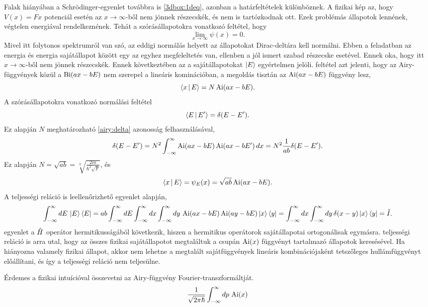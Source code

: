 \label{nowall}
Falak hiányában a Schrödinger-egyenlet továbbra is \eqref{3dbox:1deq}, azonban a határfeltételek különböznek. A fizikai kép az, hogy $V(x)=Fx$ potenciál esetén az $x\to\infty$-ből nem jönnek részecskék, és nem is tartózkodnak ott. Ezek problémás állapotok lennének, végtelen energiával rendelkeznének. Tehát a szórásállapotokra vonatkozó feltétel, hogy
\begin{equation}
	\lim_{x\to\infty}\psi(x) = 0.
	\label{nowall:boundary}
\end{equation}
Mivel itt folytonos spektrumról van szó, az eddigi normálás helyett az állapotokat Dirac-deltára kell normálni. Ebben a feladatban az energia és energia sajátállapot között egy az egyhez megfeleltetés van, ellenben a jól ismert szabad részecske esetével. Ennek oka, hogy itt $x\to\infty$-ből nem jönnek részecskék. Ennek következtében az a sajátállapotokat $\Ket{E}$ egyértelmen jelöli.
 feltétel azt jelenti, hogy az Airy-függvények közül a $\operatorname{Bi}(ax-bE)$ nem szerepel a lineáris kominációban, a megoldás tisztán az $\operatorname{Ai}(ax-bE)$ függvény lesz,
\begin{equation}
	\Braket{x|E}=N\operatorname{Ai}(ax-bE).
\end{equation}
A szórásállapotokra vonatkozó normálási feltétel
\begin{equation}
	\Braket{E|E^\prime}=\delta(E-E^\prime).
\end{equation}
Ez alapján $N$ meghatározható \eqref{airy:delta} azonosság felhasználásával,
\begin{dmath}
	\delta(E-E^\prime)=N^2\int_{-\infty}^\infty\Ai(ax-bE)\Ai(ax-bE^\prime)\,dx=N^2\frac{1}{ab}\delta(E-E^\prime).
	\label{nowall:orthog}
\end{dmath}
Ez alapján $N=\sqrt{ab}=\sqrt[3]{\frac{2m}{\hbar^2\sqrt{F}}}$, és
\begin{equation}
	\Braket{x|E}=\psi_E(x)=\sqrt{ab}\operatorname{Ai}(ax-bE).
\end{equation}
A teljességi reláció is leellenőrizhető  egyenlet alapján,
\begin{dmath}
	\int_{-\infty}^\infty dE\,\Ket{E}\Bra{E}=ab\int_{-\infty}^\infty dE\int_{-\infty}^\infty dx\int_{-\infty}^\infty dy\,\Ai(ax-bE)\Ai(ay-bE)\Ket{x}\Bra{y}=\int_{-\infty}^\infty dx\int_{-\infty}^\infty dy\,\delta(x-y)\Ket{x}\Bra{y}=\op{I}.
	\label{nowall:comleteness}
\end{dmath}
 egyenlet a $\hat{H}$ operátor hermitikusságából következik, hiszen a hermitikus operátorok sajátállapotai ortogonálisak egymásra.  teljességi reláció is arra utal, hogy az összes fizikai sajátállapotot megtaláltuk a csupán $\operatorname{Ai}(x)$ függvényt tartalmazó állapotok keresésével. Ha hiányozna valamely fizikai állapot, akkor nem lehetne a megtalált sajátfüggvények lineáris kombinációjaként tetszőleges hullámfüggvényt előállítani, és így a teljességi reláció nem teljesülne.

Érdemes a fizikai intuícióval összevetni az Airy-függvény Fourier-transzformáltját.
\begin{equation}
	\frac{1}{\sqrt{2\pi\hbar}}\int_{-\infty}^\infty dp\,\operatorname{Ai}(x)
\end{equation}








